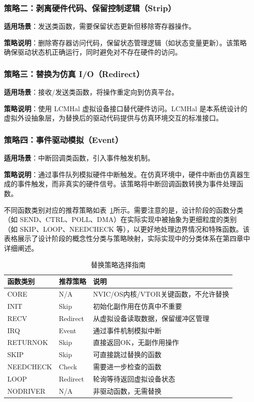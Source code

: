 \subsubsection{策略二：剥离硬件代码、保留控制逻辑（Strip）}

\textbf{适用场景}：发送类函数，需要保留状态更新但移除寄存器操作。

\textbf{策略说明}：删除寄存器访问代码，保留状态管理逻辑（如状态变量更新）。该策略确保驱动状态机正确运行，同时避免对不存在硬件的访问。

\subsubsection{策略三：替换为仿真 I/O（Redirect）}

\textbf{适用场景}：接收/发送类函数，将操作重定向到仿真平台。

\textbf{策略说明}：使用 LCMHal 虚拟设备接口替代硬件访问。LCMHal 是本系统设计的虚拟外设抽象层，为替换后的驱动代码提供与仿真环境交互的标准接口。

\subsubsection{策略四：事件驱动模拟（Event）}

\textbf{适用场景}：中断回调类函数，引入事件触发机制。

\textbf{策略说明}：通过事件队列模拟硬件中断触发。在仿真环境中，硬件中断由仿真器生成的事件触发，而非真实的硬件信号。该策略将中断回调函数转换为事件处理函数。

不同函数类别对应的推荐策略如表~\ref{tab:replace-strategies}所示。需要注意的是，设计阶段的函数分类（如 SEND、CTRL、POLL、DMA）在实际实现中被抽象为更细粒度的类别（如 SKIP、LOOP、NEEDCHECK 等），以更好地处理边界情况和特殊函数。该表格展示了设计阶段的概念性分类与策略映射，实际实现中的分类体系在第四章中详细阐述。

\begin{table}[htbp]
\centering
\caption{替换策略选择指南}
\label{tab:replace-strategies}
\begin{tabular}{lll}
\toprule
\textbf{函数类别} & \textbf{推荐策略} & \textbf{说明} \\
\midrule
CORE & N/A & NVIC/OS内核/VTOR关键函数，不允许替换 \\
INIT & Skip & 初始化副作用在仿真中不重要 \\
RECV & Redirect & 从虚拟设备读取数据，保留缓冲区管理 \\
IRQ & Event & 通过事件机制模拟中断 \\
RETURNOK & Skip & 直接返回OK，无副作用操作 \\
SKIP & Skip & 可直接跳过替换的函数 \\
NEEDCHECK & Check & 需要进一步检查的函数 \\
LOOP & Redirect & 轮询等待返回虚拟设备状态 \\
NODRIVER & N/A & 非驱动函数，无需替换 \\
\bottomrule
\end{tabular}
\end{table}

